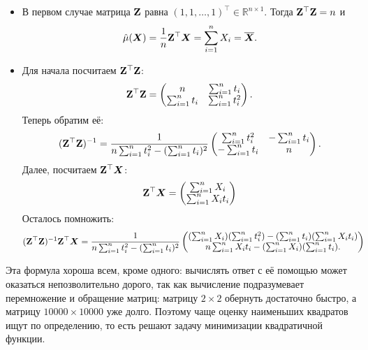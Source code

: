 \begin{itemize}
	\item В первом случае матрица $\mathbf{Z}$ равна $(1, 1, \ldots, 1)^{\top} \in \mathbb{R}^{n \times 1}$. Тогда $\mathbf{Z}^{\top}\mathbf{Z} = n$ и
	\[
		\hat{\mu}(\bm{X}) = \frac{1}{n}\mathbf{Z}^{\top}\bm{X} = \sum_{i = 1}^{n} X_{i} = \overline{\bm{X}}.
	\]
	\item Для начала посчитаем $\mathbf{Z}^{\top}\mathbf{Z}$:
	\[
		\mathbf{Z}^{\top}\mathbf{Z}
		= \begin{pmatrix}
			n & \sum_{i = 1}^{n} t_{i} \\
			\sum_{i = 1}^{n} t_{i} & \sum_{i = 1}^{n} t_{i}^{2}
		\end{pmatrix}.
	\]
	Теперь обратим её:
	\[
		(\mathbf{Z}^{\top}\mathbf{Z})^{-1}
		= \frac{1}{n\sum_{i = 1}^{n} t_{i}^{2} - (\sum_{i = 1}^{n} t_{i})^{2}}
		\begin{pmatrix}
			\sum_{i = 1}^{n} t_{i}^{2} & -\sum_{i = 1}^{n} t_{i} \\
			-\sum_{i = 1}^{n} t_{i} & n
		\end{pmatrix}.
	\]
	Далее, посчитаем $\mathbf{Z}^{\top}\bm{X}$:
	\[
		\mathbf{Z}^{\top}\bm{X}
		= \begin{pmatrix}
			\sum_{i = 1}^{n} X_{i} \\
			\sum_{i = 1}^{n} X_{i} t_{i}
		\end{pmatrix}
	\]
	Осталось помножить:
	\begin{align*}
		(\mathbf{Z}^{\top}\mathbf{Z})^{-1}\mathbf{Z}^{\top}\bm{X}
		&= \frac{1}{n\sum_{i = 1}^{n} t_{i}^{2} - (\sum_{i = 1}^{n} t_{i})^{2}}
		\begin{pmatrix}
			(\sum_{i = 1}^{n} X_{i})(\sum_{i = 1}^{n} t_{i}^{2}) - (\sum_{i = 1}^{n} t_{i})(\sum_{i = 1}^{n} X_{i} t_{i}) \\
			n\sum_{i = 1}^{n} X_{i} t_{i} - (\sum_{i = 1}^{n} X_{i})(\sum_{i = 1}^{n} t_{i}).
		\end{pmatrix}
	\end{align*}
\end{itemize}
Эта формула хороша всем, кроме одного: вычислять ответ с её помощью может оказаться непозволительно дорого, так как вычисление подразумевает перемножение и обращение матриц: матрицу $2 \times 2$ обернуть достаточно быстро, а матрицу $10000 \times 10000$ уже долго. Поэтому чаще оценку наименьших квадратов ищут по определению, то есть решают задачу минимизации квадратичной функции.

